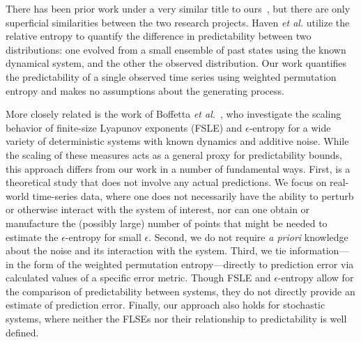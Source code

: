 There has been prior work under a very similar title to
ours~\cite{haven2005}, but there are only superficial similarities
between the two research projects. Haven \emph{et al.} utilize the
relative entropy to quantify the difference in predictability between
two distributions: one evolved from a small ensemble of past states
using the known dynamical system, and the other the observed
distribution. Our work quantifies the predictability of a single
observed time series using weighted permutation entropy and makes no
assumptions about the generating process.

More closely related is the work of Boffetta \emph{et
  al.}~\cite{boffetta02}, who investigate the scaling behavior of
finite-size Lyapunov exponents (FSLE) and $\epsilon$-entropy for a
wide variety of deterministic systems with known dynamics and additive
noise.  While the scaling of these measures acts as a general proxy
for predictability bounds, this approach differs from our work in a
number of fundamental ways.  First, \cite{boffetta02} is a theoretical
study that does not involve any actual predictions.  We focus on
real-world time-series data, where one does not necessarily have the
ability to perturb or otherwise interact with the system of interest,
nor can one obtain or manufacture the (possibly large) number of
points that might be needed to estimate the $\epsilon$-entropy for
small $\epsilon$.  Second, we do not require \emph{a priori} knowledge
about the noise and its interaction with the system.  Third, we tie
information---in the form of the weighted permutation
entropy---directly to prediction error via calculated values of a
specific error metric.  Though FSLE and $\epsilon$-entropy allow for
the comparison of predictability between systems, they do not directly
provide an estimate of prediction error.  Finally, our approach also
holds for stochastic systems, where neither the FLSEs nor their
relationship to predictability is well defined.
